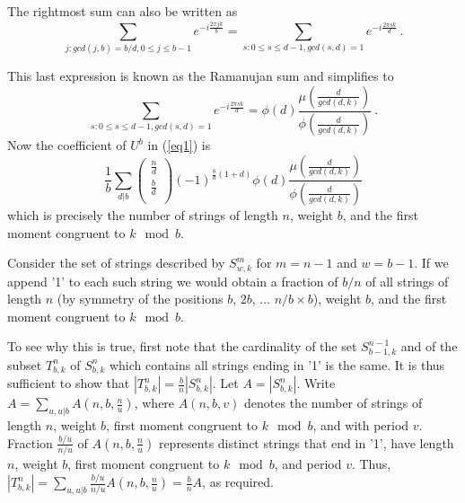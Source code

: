 The rightmost sum can also be written as
\begin{equation}
\sum_{j:gcd(j,b)=b/d, 0 \leq j\leq b-1}e^{-i\frac{2\pi
                           j k}{b}}= \sum_{s:0 \leq s\leq d-1,gcd(s,d)=1}
e^{-i\frac{2\pi
                           s k}{d}}~.
\end{equation}


This last expression is known as the Ramanujan sum \cite{apostol}
and simplifies to \begin{equation}\sum_{s:0 \leq s\leq
d-1,gcd(s,d)=1}e^{-i\frac{2\pi
                           s k}{d}}=\phi(d)
\frac{\mu\left(\frac{d}{gcd(d,k)}\right)}{\phi\left(\frac{d}{gcd(d,k)}\right)}~.
                           \end{equation}
Now the coefficient of $U^b$ in (\ref{eq1}) is
\begin{equation}\label{eq2}
\frac{1}{b} \sum_{d|b} \left( \begin{array}{c}
                             \frac{n}{d} \\
                             \frac{b}{d} \\
                           \end{array} \right)(-1)^{\frac{b}{d}(1+d)}\phi(d) \frac{\mu\left(\frac{d}{gcd(d,k)}\right)}{\phi\left(\frac{d}{gcd(d,k)}\right)}
\end{equation}
which is precisely the number of strings of length $n$, weight
$b$, and the first moment congruent to $k \mod b$.

Consider the set of strings described by $S_{w,k}^m$ for $m=n-1$
and $w=b-1$. If we append '1' to each such string we would obtain
a fraction of $b/n$ of all strings of length $n$ (by symmetry of
the positions $b$, $2b$, $\dots$ $n/b \times b$), weight $b$, and
the first moment congruent to $k \mod b$.

To see why this is true, first note that the cardinality of the
set $S_{b-1,k}^{n-1}$ and of the subset $T_{b,k}^n$ of $S_{b,k}^n$
which contains all strings ending in '1' is the same. It is thus
sufficient to show that $|T_{b,k}^n|=\frac{b}{n} |S_{b,k}^n|$. Let
$A=|S_{b,k}^n|$. Write $A=\sum_{u,u|b} A(n,b,\frac{n}{u})$, where
$A(n,b,v)$ denotes the number of strings of length $n$, weight
$b$, first moment congruent to $k \mod b$, and with period $v$.
Fraction $\frac{b/u}{n/u}$ of $A(n,b,\frac{n}{u})$ represents
distinct strings that end in '1', have length $n$, weight $b$,
first moment congruent to $k \mod b$, and period $v$. Thus,
 $|T_{b,k}^n|=\sum_{u,u|b} \frac{b/u}{n/u}
 A(n,b,\frac{n}{u})=\frac{b}{n}A$, as required.


